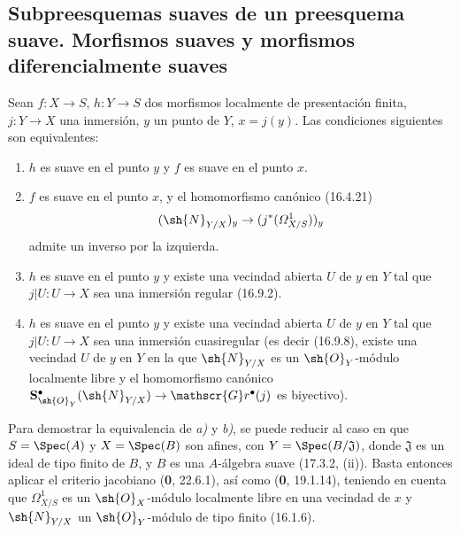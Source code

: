 \subsection{Subpreesquemas suaves de un preesquema suave. Morfismos suaves y morfismos diferencialmente suaves}
\label{subsection:IV.17.12}

\begin{theorem}[17.12.1]
\label{IV.17.12.1}
Sean $f:X\to S$, $h:Y\to S$ dos morfismos localmente de presentación finita, $j:Y\to X$ una inmersión, $y$ un punto de $Y$, $x=j(y)$. Las condiciones siguientes son equivalentes:
\begin{enumerate}
  \item[\textup{a)}] $h$ es suave en el punto $y$ y $f$ es suave en el punto $x$.
  \item[\textup{b)}] $f$ es suave en el punto $x$, y el homomorfismo canónico \textup{(16.4.21)}
  \[
  (\sh{N}_{Y/X})_y\to(j^*(\varOmega^1_{X/S}))_y
  \]
  admite un inverso por la izquierda.
  \item[\textup{c)}] $h$ es suave en el punto $y$ y existe una vecindad abierta $U$ de $y$ en $Y$ tal que $j|U:U\to X$ sea una inmersión regular \textup{(16.9.2)}.


  \item[\textup{c$'$)}] $h$ es suave en el punto $y$ y existe una vecindad abierta $U$ de $y$ en $Y$ tal que $j|U:U\to X$ sea una inmersión cuasiregular \textup{(es decir (16.9.8), existe una vecindad $U$ de $y$ en $Y$ en la que $\sh{N}_{Y/X}$ es un $\sh{O}_Y$-módulo localmente libre y el homomorfismo canónico
  $\mathbf{S}^{\bullet}_{\sh{O}_Y}(\sh{N}_{Y/X})\to\mathscr{G}r^{\bullet}(j)$
  es biyectivo)}.
\end{enumerate}
\end{theorem}

Para demostrar la equivalencia de \emph{a)} y \emph{b)}, se puede reducir al caso en que $S=\Spec(A)$ y $X=\Spec(B)$ son afines, con $Y=\Spec(B/\mathfrak J)$, donde $\mathfrak J$ es un ideal de tipo finito de $B$, y $B$ es una $A$-álgebra suave (17.3.2, (ii)). Basta entonces aplicar el criterio jacobiano (\textbf 0, 22.6.1), así como (\textbf 0, 19.1.14), teniendo en cuenta que $\varOmega^1_{X/S}$ es un $\sh{O}_X$-módulo localmente libre en una vecindad de $x$ y $\sh{N}_{Y/X}$ un $\sh{O}_Y$-módulo de tipo finito (16.1.6).

